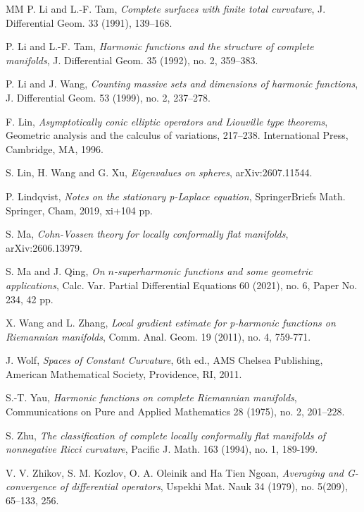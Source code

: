 \documentclass[12pt]{amsart}
\theoremstyle{plain}
\theoremstyle{definition}
\theoremstyle{remark}     %
\numberwithin{equation}{section}
\begin{document}
\begin{thebibliography}{MM}
 P. Li and L.-F. Tam, \emph{Complete surfaces with finite total curvature}, J. Differential Geom. 33 (1991), 139–168.

P. Li and L.-F. Tam, \emph{Harmonic functions and the structure of complete manifolds},
J. Differential Geom. 35 (1992), no. 2, 359–383.

 P. Li and J. Wang, \emph{Counting massive sets and dimensions of harmonic functions},
J. Differential Geom. 53 (1999), no. 2, 237–278.


 F. Lin, \emph{Asymptotically conic elliptic operators and Liouville type theorems}, 
Geometric analysis and the calculus of variations, 217–238.
International Press, Cambridge, MA, 1996.

 S. Lin, H. Wang and G. Xu, \emph{Eigenvalues on spheres}, arXiv:2607.11544.

 P. Lindqvist, \emph{Notes on the stationary p-Laplace equation}, SpringerBriefs Math. 
Springer, Cham, 2019, xi+104 pp.

 S. Ma, \emph{Cohn-Vossen theory for locally conformally flat manifolds}, arXiv:2606.13979.

 S. Ma and J. Qing,  \emph{On  $n$-superharmonic functions and some geometric applications},
Calc. Var. Partial Differential Equations 60 (2021), no. 6, Paper No. 234, 42 pp.




 X. Wang and L. Zhang,
\emph{Local gradient estimate for p-harmonic functions on Riemannian manifolds},
Comm. Anal. Geom. 19 (2011), no. 4, 759-771.

 J. Wolf,
\emph{Spaces of Constant Curvature},
6th ed., AMS Chelsea Publishing,
American Mathematical Society, Providence, RI, 2011.

 S.-T. Yau, \emph{Harmonic functions on complete Riemannian manifolds}, Communications on Pure and Applied Mathematics 28 (1975), no. 2, 201–228.

S. Zhu,
\textit{The classification of complete locally conformally flat manifolds of nonnegative Ricci curvature},
Pacific J. Math. 163 (1994), no. 1, 189-199.

V. V. Zhikov, S. M. Kozlov, O. A. Oleinik and  Ha Tien Ngoan,
\emph{Averaging and G-convergence of differential operators},
Uspekhi Mat. Nauk 34 (1979), no. 5(209), 65–133, 256.

\end{thebibliography}
\end{document}
